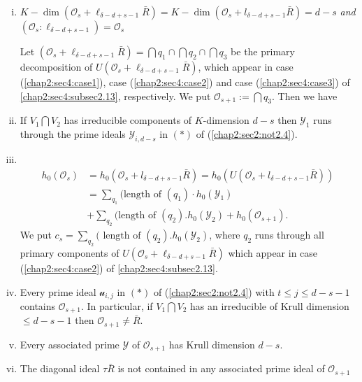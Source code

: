 \begin{enumerate}[(i)]
\item $K-\dim (\mathscr{O}_s+\ell_{\delta-d+s-1}\bar{R})=K-\dim
  (\mathscr{O}_s+l_{\delta -d+s-1}\bar{R})=d-s$ \textit{and}
  $(\mathscr{O}_s:\ell_{\delta -d+s-1})=\mathscr{O}_s$ 

  Let $(\mathscr{O}_s+\ell_{\delta -d+s-1}\bar{R})=\bigcap q_1\cap
  \bigcap q_2 \cap \bigcap q_3$ be the primary decomposition of\pageoriginale
  $U(\mathscr{O}_s+\ell_{\delta -d+s-1}\bar{R})$, which appear in case
  (\ref{chap2:sec4:case1}), case (\ref{chap2:sec4:case2}) and case
  (\ref{chap2:sec4:case3}) of \ref{chap2:sec4:subsec2.13},
  respectively. We put 
  $\mathscr{O}_{s+1}:=\bigcap q_3$. Then we have 
\item If $V_1 \bigcap V_2$ has irreducible components of $K$-dimension
  $d-s$ then $\mathscr{Y}_1$ runs through the prime ideals
  $\mathscr{Y}_{i, d-s}$ in $(*)$ of (\ref{chap2:sec2:not2.4}). 
\item ~
\vskip -1.5cm
  \begin{align*}
    h_0 (\mathscr{O}_s) & = h_0(\mathscr{O}_s+l_{\delta
      -d+s-1}\bar{R})=h_0(U(\mathscr{O}_s+l_{\delta
      -d+s-1}\bar{R}))\\ 
    & = \sum _{q_1}(\text{length of }(q_1)\cdot h_0(\mathscr{Y}_1)\\
    & + \sum _{q_2}(\text{length of }(q_2).h_0
    (\mathscr{Y}_2)+h_0(\mathscr{O}_{s+1}). 
  \end{align*} 
  We put $c_s=\sum \limits_{q_2} (\text{ length of }(q_2).h_0
  (\mathscr{Y}_2)$, where $q_2$ runs through all primary
    components of $U(\mathscr{O}_s+\ell_{\delta -d+s-1}\bar{R})$ which
    appear in case (\ref{chap2:sec4:case2}) of \ref{chap2:sec4:subsec2.13}. 
  \item Every prime ideal $\mathscr{u}_{i, j}$ in $(*)$ of
    (\ref{chap2:sec2:not2.4}) with $t \leq j \leq d-s-1$ contains $\mathscr{O}_{s+1}$. In
    particular, if $V_1 \bigcap V_2$ has an irreducible of Krull
    dimension $\leq d-s-1$ then $\mathscr{O}_{s+1}\neq \bar{R}$. 
  \item Every associated prime $\mathscr{Y}$ of
    $\mathscr{O}_{s+1}$ has Krull dimension $d-s$. 
  \item The diagonal ideal $\tau \bar{R}$ is not contained in
    any associated prime ideal of $\mathscr{O}_{s+1}$ 
 

\end{enumerate}
